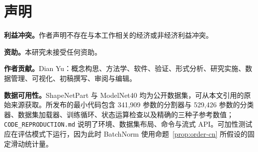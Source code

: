 \documentclass[UTF8,a4paper,11pt,fontset=windows]{ctexart}
\begin{document}
\section*{声明}
\noindent\textbf{利益冲突。}作者声明不存在与本工作相关的经济或非经济利益冲突。

\noindent\textbf{资助。}本研究未接受任何资助。

\noindent\textbf{作者贡献。}Dian Yu：概念构思、方法学、软件、验证、形式分析、研究实施、数据管理、可视化、初稿撰写、审阅与编辑。

\noindent\textbf{数据可用性。}ShapeNetPart 与 ModelNet40 均为公开数据集，可从本文引用的原始来源获取。所发布的最小代码包含 341,909 参数的分割器与 529,426 参数的分类器、数据集加载器、训练循环、状态运算检查以及精确的三种子参考数值；\texttt{CODE\_REPRODUCTION.md} 说明了环境、数据集布局、命令与流式 API。可加性测试应在评估模式下运行，因为此时 BatchNorm 使用命题~\ref{prop:order-cn} 所假设的固定滑动统计量。



\end{document}
